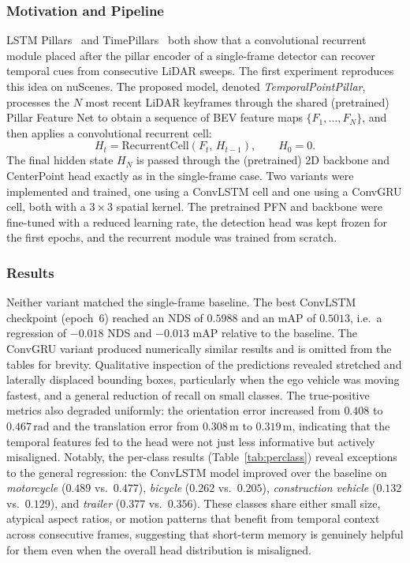 \documentclass[12pt,a4paper]{report}
\begin{document}
\subsubsection{Motivation and Pipeline}
\quad LSTM Pillars~\cite{Huang2020LSTMPillars} and
TimePillars~\cite{Hammarstrand2024TimePillars} both show that a
convolutional recurrent module placed after the pillar encoder of
a single-frame detector can recover temporal cues from consecutive
LiDAR sweeps. The first experiment reproduces this idea on nuScenes. The proposed model, denoted
\emph{TemporalPointPillar}, processes the $N$ most recent LiDAR
keyframes through the shared (pretrained) Pillar Feature Net to
obtain a sequence of BEV feature maps $\{F_1, \dots, F_N\}$, and
then applies a convolutional recurrent cell:
\[
H_t = \mathrm{RecurrentCell}(F_t,\, H_{t-1}), \qquad H_0 = 0.
\]
The final hidden state $H_N$ is passed through the (pretrained) 2D
backbone and CenterPoint head exactly as in the single-frame case.
Two variants were implemented and trained, one using a ConvLSTM
cell and one using a ConvGRU cell, both with a $3 \times 3$
spatial kernel. The pretrained PFN and backbone were fine-tuned
with a reduced learning rate, the detection head was kept frozen
for the first epochs, and the recurrent module was trained from
scratch.

\subsubsection{Results}
\quad Neither variant matched the single-frame baseline. The best
ConvLSTM checkpoint (epoch~6) reached an NDS of $0.5988$ and an
mAP of $0.5013$, i.e.\ a regression of $-0.018$ NDS and $-0.013$
mAP relative to the baseline. The ConvGRU variant produced
numerically similar results and is omitted from the tables for
brevity. Qualitative inspection of the predictions revealed
stretched and laterally displaced bounding boxes, particularly
when the ego vehicle was moving fastest, and a general reduction
of recall on small classes. The true-positive metrics also
degraded uniformly: the orientation error increased from $0.408$
to $0.467\,\text{rad}$ and the translation error from
$0.308\,\text{m}$ to $0.319\,\text{m}$, indicating that the
temporal features fed to the head were not just less informative
but actively misaligned. Notably, the per-class results
(Table~\ref{tab:perclass}) reveal exceptions to the general
regression: the ConvLSTM model improved over the baseline on
\emph{motorcycle} ($0.489$ vs.\ $0.477$), \emph{bicycle}
($0.262$ vs.\ $0.205$), \emph{construction vehicle} ($0.132$
vs.\ $0.129$), and \emph{trailer} ($0.377$ vs.\ $0.356$).
These classes share either small size, atypical aspect ratios,
or motion patterns that benefit from temporal context across
consecutive frames, suggesting that short-term memory is
genuinely helpful for them even when the overall head
distribution is misaligned.
\end{document}
